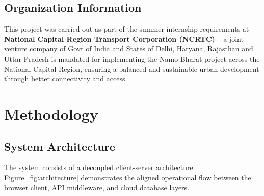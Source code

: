 \documentclass[12pt,a4paper,oneside]{article}
\begin{document}
\subsection{Organization Information}
This project was carried out as part of the summer internship requirements at \textbf{National Capital Region Transport Corporation (NCRTC)} – a joint venture company of Govt of India and States of Delhi, Haryana, Rajasthan and Uttar Pradesh is mandated for implementing the Namo Bharat project across the National Capital Region, ensuring a balanced and sustainable urban development through better connectivity and access.

\section{Methodology}
\label{sec:methodology}

\subsection{System Architecture}
The system consists of a decoupled client-server architecture. Figure~\ref{fig:architecture} demonstrates the aligned operational flow between the browser client, API middleware, and cloud database layers.
\end{document}
